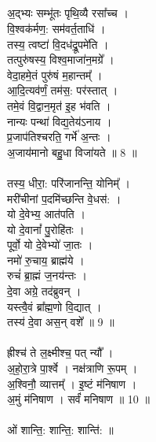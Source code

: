 \subsection{}
अ॒द्भ्यः सम्भू॑तः पृथि॒व्यै रसा᳚च्च ।\\
वि॒श्वक॑र्मण॒: सम॑वर्त॒ताधि॑ ।\\
तस्य॒ त्वष्टा॑ वि॒दध॑द्रू॒पमे॑ति ।\\
तत्पुरु॑षस्य॒ विश्व॒माजा॑न॒मग्रे᳚ ।\\
वेदा॒हमे॒तं पुरु॑षं म॒हान्तम्᳚ ।\\
आ॒दि॒त्यव॑र्णं॒ तम॑स॒: पर॑स्तात् ।\\
तमे॒वं वि॒द्वान॒मृत॑ इ॒ह भ॑वति ।\\
नान्यः पन्था॑ विद्य॒तेय॑ऽनाय ।\\
प्र॒जाप॑तिश्चरति॒ गर्भे॑ अ॒न्तः ।\\
अ॒जाय॑मानो बहु॒धा विजा॑यते ॥ 8 ॥\\
\\
तस्य॒ धीरा॒: परि॑जानन्ति॒ योनिम्᳚ ।\\
मरी॑चीनां प॒दमि॑च्छन्ति वे॒धस॑: ।\\
यो दे॒वेभ्य॒ आत॑पति ।\\
यो दे॒वानां᳚ पु॒रोहि॑तः ।\\
पूर्वो॒ यो दे॒वेभ्यो॑ जा॒तः ।\\
नमो॑ रु॒चाय॒ ब्राह्म॑ये ।\\
रुचं॑ ब्रा॒ह्मं ज॒नय॑न्तः ।\\
दे॒वा अग्रे॒ तद॑ब्रुवन् ।\\
यस्त्वै॒वं ब्रा᳚ह्म॒णो वि॒द्यात् ।\\
तस्य॑ दे॒वा अस॒न् वशे᳚ ॥ 9 ॥\\
\\
ह्रीश्च॑ ते ल॒क्ष्मीश्च॒ पत् न्यौ᳚ ।\\
अ॒हो॒रा॒त्रे पा॒र्श्वे । नक्ष॑त्राणि रू॒पम् ।\\
अ॒श्विनौ॒ व्यात्तम्᳚ । इ॒ष्टं म॑निषाण ।\\
अ॒मुं म॑निषाण । सर्वं॑ मनिषाण ॥ 10 ॥\\
\\
ओं शान्ति॒: शान्ति॒: शान्ति॑: ॥\\
